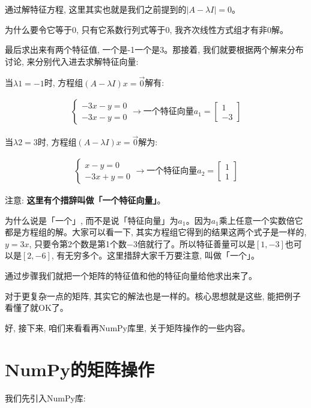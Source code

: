 通过解特征方程, 这里其实也就是我们之前提到的$|A - \lambda I| =0$。

为什么要令它等于0, 只有它系数行列式等于0, 我齐次线性方式组才有非0解。

最后求出来有两个特征值, 一个是-1一个是3。那接着, 我们就要根据两个解来分布讨论, 来分别代入进去求解特征向量: 

当$\lambda 1 = -1$时, 方程组$(A - \lambda I)x = \vec 0$解有: 

\begin{align*}
\begin{cases}
-3x - y = 0 \\
-3x - y = 0
\end{cases}
\to\mbox{一个特征向量}a_1 = \begin{bmatrix} 1 \\ -3 \end{bmatrix}
\end{align*}

当$\lambda 2 = 3$时, 方程组$(A - \lambda I)x = \vec 0$解为: 

\begin{align*}
\begin{cases}
x - y = 0 \\
-3x + y = 0
\end{cases}
\to \mbox{一个特征向量} a_2 = \begin{bmatrix} 1 \\ 1 \end{bmatrix}
\end{align*}

注意: \textbf{这里有个措辞叫做「一个特征向量」}。

为什么说是「一个」, 而不是说「特征向量」为$a_1$。因为$a_1$乘上任意一个实数倍它都是方程组的解。大家可以看一下, 其实方程组它得到的结果这两个式子是一样的, $y=3x$, 只要令第2个数是第1个数$-3$倍就行了。所以特征善量可以是$[1, -3]$也可以是$[2, -6]$, 有无穷多个。这里措辞大家千万要注意, 叫做「一个」。

通过步骤我们就把一个矩阵的特征值和他的特征向量给他求出来了。

对于更复杂一点的矩阵, 其实它的解法也是一样的。核心思想就是这些, 能把例子看懂了就OK了。

好, 接下来, 咱们来看看再NumPy库里, 关于矩阵操作的一些内容。

\section{NumPy的矩阵操作}

我们先引入NumPy库: 

